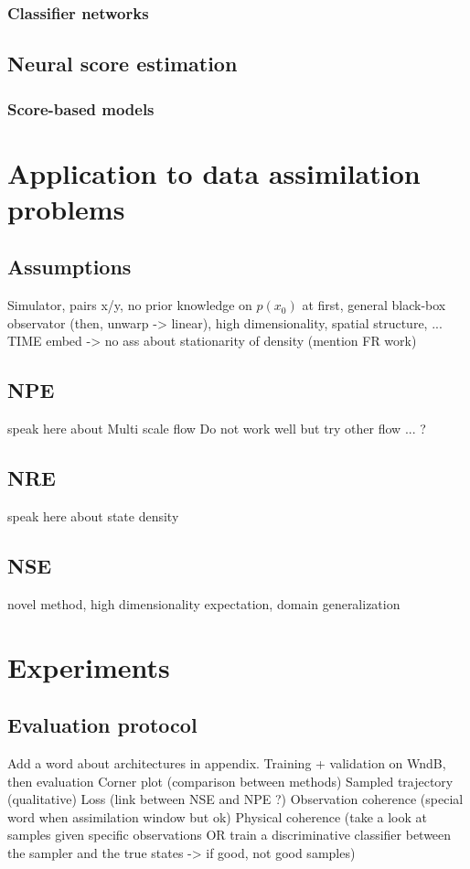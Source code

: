 \documentclass[a4paper, 12pt]{article}
\begin{document}
\subsubsection{Classifier networks}
\subsection{Neural score estimation}
\subsubsection{Score-based models}

\section{Application to data assimilation problems}
\subsection{Assumptions}
Simulator, pairs x/y, no prior knowledge on $p(x_0)$ at first,
general black-box observator (then, unwarp -> linear), high dimensionality,
spatial structure, ... TIME embed -> no ass about stationarity of density (mention FR work)

\subsection{NPE}
speak here about Multi scale flow
Do not work well but try other flow ... ?
\subsection{NRE}
speak here about state density 
\subsection{NSE}
novel method, high dimensionality expectation, domain generalization

\section{Experiments}
\subsection{Evaluation protocol}
Add a word about architectures in appendix.
Training + validation on WndB, then evaluation 
Corner plot (comparison between methods)
Sampled trajectory (qualitative)
Loss (link between NSE and NPE ?)
Observation coherence (special word when assimilation window but ok)
Physical coherence (take a look at samples given specific observations OR train a 
discriminative classifier between the sampler and the true states -> if good, not good samples)
\end{document}
